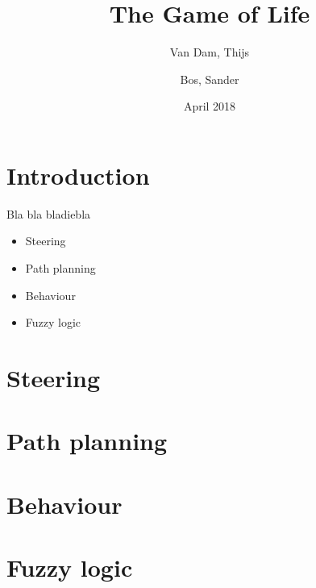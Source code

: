 \documentclass[11pt]{extarticle}
\author{Van Dam, Thijs\\
\and
Bos, Sander\\
}
\title{\huge The Game of Life}
\date{April 2018}
\begin{document}
    \maketitle
    \thispagestyle{empty}
    \newpage
    \newpage
    \setcounter{page}{1}
    \section{Introduction}\label{sec:introduction}
    Bla bla bladiebla
    \begin{itemize}
        \item Steering
        \item Path planning
        \item Behaviour
        \item Fuzzy logic
    \end{itemize}

    \newpage
    \tableofcontents
    \newpage
    \section{Steering}\label{sec:steering}

    \newpage
    \section{Path planning}\label{sec:pathPlanning}

    \newpage
    \section{Behaviour}\label{sec:behaviour}

    \newpage
    \section{Fuzzy logic}\label{sec:fuzzyLogic}

    \newpage
\end{document}
